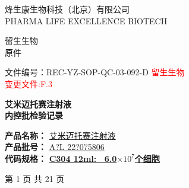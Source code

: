 \documentclass[UTF8,10pt,a4paper,fontset=fandol]{ctexart}
\newcommand{\fieldvalue}[1]{#1}
\newcommand{\handwritten}[1]{#1}
\begin{document}
\noindent
\begin{minipage}{0.28\linewidth}
\centering
\small
烽生康生物科技（北京）有限公司\\
\scriptsize PHARMA LIFE EXCELLENCE BIOTECH
\end{minipage}
\hfill
\begin{minipage}{0.18\linewidth}
\centering
\scriptsize 留生生物\\
原件
\end{minipage}
\hfill
\begin{minipage}{0.48\linewidth}
\raggedright
\small 文件编号：REC-YZ-SOP-QC-03-092-D
\hfill
\textcolor{red}{\scriptsize 留生生物\\变更文件:F.3}
\end{minipage}

\vspace{3.5cm}

\begin{center}
{\LARGE\bfseries 艾米迈托赛注射液}\\[1.1em]
{\LARGE\bfseries 内控批检验记录}
\end{center}

\vspace{4.7cm}

\noindent
\hspace{7em}\textbf{产品名称：}
\underline{\hspace{2.8em}
\fieldvalue{艾米迈托赛注射液}
\hspace{5.0em}}\\[1.8em]

\noindent
\hspace{7em}\textbf{产品批号：}
\underline{\hspace{1.0em}
\fieldvalue{\handwritten{A?L 22?075806}}
\hspace{5.0em}}\\[1.8em]

\noindent
\hspace{7em}\textbf{代码规格：}
\underline{\hspace{1.0em}
\fieldvalue{\textbf{C304 \quad 12ml: \ 6.0$\times 10^{7}$个细胞}}
\hspace{1.0em}}

\vfill

\begin{center}
\scriptsize 第 1 页 共 21 页
\end{center}
\end{document}
